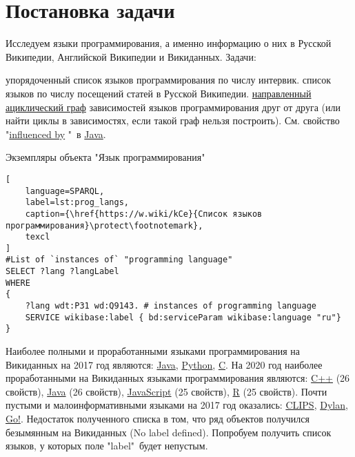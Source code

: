 \section{Постановка задачи}
Исследуем языки программирования, а именно информацию о них в Русской Википедии, Английской Википедии и Викиданных.
Задачи:
\begin{enumerate} 
   упорядоченный список языков программирования по числу интервик.
   список языков по числу посещений статей в Русской Википедии.
   \href{https://en.wikipedia.org/wiki/Directed_acyclic_graph}{направленный ациклический граф} зависимостей языков программирования друг от друга (или найти циклы в зависимостях, если такой граф нельзя построить). См. свойство "\href{https://www.wikidata.org/wiki/Property:P737}{influenced by}
"\  в \href{https://www.wikidata.org/wiki/Q251}{Java}.
\end{enumerate}

Экземпляры объекта "Язык программирования"

\begin{lstlisting}[
	language=SPARQL,
	label=lst:prog_langs,
	caption={\href{https://w.wiki/kCe}{Список языков программирования}\protect\footnotemark},
	texcl 
]
#List of `instances of` "programming language" 
SELECT ?lang ?langLabel
WHERE
{
    ?lang wdt:P31 wd:Q9143. # instances of programming language
    SERVICE wikibase:label { bd:serviceParam wikibase:language "ru"}
}
\end{lstlisting}

Наиболее полными и проработанными языками программирования на Викиданных на 2017 год являются: \href{https://www.wikidata.org/wiki/Q251}{Java}, \href{https://www.wikidata.org/wiki/Q28865}{Python}, \href{https://www.wikidata.org/wiki/Q15777}{C}. На 2020 год наиболее проработанными на Викиданных языками программирования являются: \href{https://www.wikidata.org/wiki/Q2407}{C++} (26 свойств), \href{https://www.wikidata.org/wiki/Q251}{Java} (26 свойств), \href{https://www.wikidata.org/wiki/Q2005}{JavaScript} (25 свойств), \href{https://www.wikidata.org/wiki/Q206904}{R} (25 свойств).
Почти пустыми и малоинформативными языками на 2017 год оказались: \href{https://www.wikidata.org/wiki/Q165372}{CLIPS}, \href{https://www.wikidata.org/wiki/Q1268744}{Dylan}, \href{https://www.wikidata.org/wiki/Q3109515}{Go!}.
Недостаток полученного списка в том, что ряд объектов получился безымянным на Викиданных (No label defined). Попробуем получить список языков, у которых поле "label"\  будет непустым.

